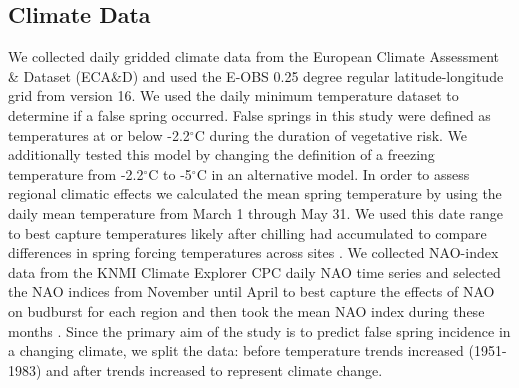 \documentclass{article}\usepackage[]{graphicx}\usepackage[]{color}
\begin{document}
\subsection*{Climate Data}
We collected daily gridded climate data from the European Climate Assessment \& Dataset (ECA\&D) and used the E-OBS 0.25 degree regular latitude-longitude grid from version 16. We used the daily minimum temperature dataset to determine if a false spring occurred. False springs in this study were defined as temperatures at or below -2.2$^{\circ}$C \citep{Schwartz1993} during the duration of vegetative risk. We additionally tested this model by changing the definition of a freezing temperature from -2.2$^{\circ}$C \citep{Schwartz1993} to -5$^{\circ}$C \citep{Lenz2013, Sakai1987} in an alternative model. In order to assess regional climatic effects we calculated the mean spring temperature by using the daily mean temperature from March 1 through May 31. We used this date range to best capture temperatures likely after chilling had accumulated %
to compare differences in spring forcing temperatures across sites \citep{Basler2012, Korner2016}. We collected NAO-index data from the KNMI Climate Explorer CPC daily NAO time series and selected the NAO indices from November until April to best capture the effects of NAO on budburst for each region and then took the mean NAO index during these months \citep{NAOdata}. Since the primary aim of the study is to predict false spring incidence in a changing climate, we split the data: before temperature trends increased (1951-1983) and after trends increased \citep[1984-2016,][]{Kharouba2018, Stocker2013} to represent climate change.
\end{document}
